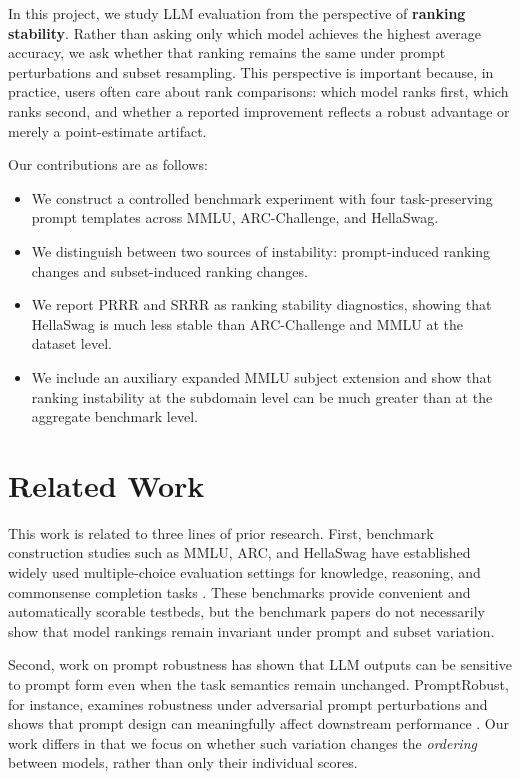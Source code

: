 \documentclass[11pt]{article}
\theoremstyle{definition}
\begin{document}
In this project, we study LLM evaluation from the perspective of \textbf{ranking stability}. Rather than asking only which model achieves the highest average accuracy, we ask whether that ranking remains the same under prompt perturbations and subset resampling. This perspective is important because, in practice, users often care about rank comparisons: which model ranks first, which ranks second, and whether a reported improvement reflects a robust advantage or merely a point-estimate artifact.

Our contributions are as follows:
\begin{itemize}[leftmargin=*]
    \item We construct a controlled benchmark experiment with four task-preserving prompt templates across MMLU, ARC-Challenge, and HellaSwag.
    \item We distinguish between two sources of instability: prompt-induced ranking changes and subset-induced ranking changes.
    \item We report PRRR and SRRR as ranking stability diagnostics, showing that HellaSwag is much less stable than ARC-Challenge and MMLU at the dataset level.
    \item We include an auxiliary expanded MMLU subject extension and show that ranking instability at the subdomain level can be much greater than at the aggregate benchmark level.
\end{itemize}

\section{Related Work}

This work is related to three lines of prior research. First, benchmark construction studies such as MMLU, ARC, and HellaSwag have established widely used multiple-choice evaluation settings for knowledge, reasoning, and commonsense completion tasks \cite{hendrycks2020mmlu, clark2018arc, zellers2019hellaswag}. These benchmarks provide convenient and automatically scorable testbeds, but the benchmark papers do not necessarily show that model rankings remain invariant under prompt and subset variation.

Second, work on prompt robustness has shown that LLM outputs can be sensitive to prompt form even when the task semantics remain unchanged. PromptRobust, for instance, examines robustness under adversarial prompt perturbations and shows that prompt design can meaningfully affect downstream performance \cite{zhu2023promptrobust}. Our work differs in that we focus on whether such variation changes the \emph{ordering} between models, rather than only their individual scores.
\end{document}
